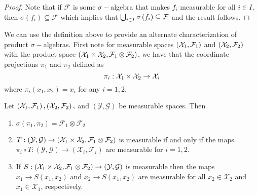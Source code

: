 \begin{proof}
Note that if $\mathcal{F}$ is some $\sigma-$algebra that makes $f_{i}$
measurable for all $i\in I$, then $\sigma\left(f_{i}\right)\subseteq\mathcal{F}$
which implies that $\bigcup_{i\in I}\sigma\left(f_{i}\right)\subseteq\mathcal{F}$
and the result follows.
\end{proof}
\begin{rem*}
We can use the definition above to provide an alternate characterization
of product $\sigma-$algebras. First note for measurable spaces $\left(\mathcal{X}_{1},\mathcal{F}_{1}\right)$
and $\left(\mathcal{X}_{2},\mathcal{F}_{2}\right)$ with the product space
$\left(\mathcal{X}_{1}\times\mathcal{\mathcal{X}}_{2},\mathcal{F}_{1}\otimes\mathcal{F}_{2}\right)$,
we have that the coordinate projections $\pi_{1}$ and $\pi_{2}$
defined as
\[
\pi_{i}:\mathcal{X}_{1}\times\mathcal{\mathcal{X}}_{2}\to\mathcal{X}_{i}
\]
where $\pi_{i}\left(x_{1},x_{2}\right)=x_{i}$ for any $i=1,2.$
\end{rem*}
\begin{prop}
\label{prop:altProductSigma}Let $\left(\mathcal{X}_{1},\mathcal{F}_{1}\right),\left(\mathcal{X}_{2},\mathcal{F}_{2}\right),$
and $\left(\mathcal{Y},\mathcal{G}\right)$ be measurable spaces.
Then

\begin{enumerate}[label=(\roman*),leftmargin=.1\linewidth,rightmargin=.4\linewidth]
\item $\sigma \left( \pi_1, \pi_2 \right) = \mathcal{F}_1 \otimes \mathcal{F}_2$
\item  $T:\left(\mathcal{Y},\mathcal{G}\right) \to \left(\mathcal{X}_{1}\times\mathcal{\mathcal{X}}_{2},\mathcal{F}_{1}\otimes\mathcal{F}_{2}\right)$ is measurable if and only if the maps $\pi_i \circ T :\left(\mathcal{Y},\mathcal{G}\right) \to \left(\mathcal{X}_i, \mathcal{F}_i\right)$ are measurable for $i=1,2$.
\item If $ S:\left(\mathcal{X}_{1}\times\mathcal{\mathcal{X}}_{2},\mathcal{F}_{1}\otimes\mathcal{F}_{2}\right) \to \left(\mathcal{Y},\mathcal{G}\right)$ is measurable then the maps $x_1 \to S(x_1,x_2)$ and $x_2 \to S(x_1, x_2)$ are measurable for all $x_2 \in \mathcal{X}_2$ and $x_1 \in \mathcal{X}_1$, respectively.
\end{enumerate}
\end{prop}

